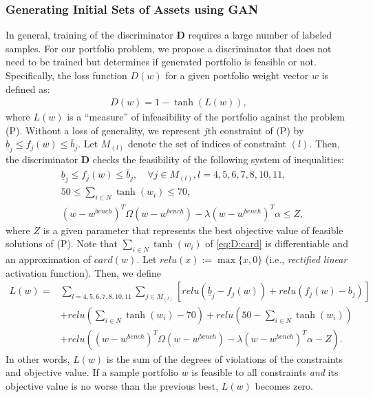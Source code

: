 \documentclass[11pt]{article}
\begin{document}
	\subsubsection{Generating Initial Sets of Assets using GAN}
	
	In general, training of the discriminator \textbf{D} requires a large number of labeled samples. For our portfolio problem, we propose a discriminator that does not need to be trained but determines if generated portfolio is feasible or not. 
	Specifically, the loss function $D(w)$ for a given portfolio weight vector $w$ is defined as:
	\begin{align}
	D(w) = 1 - \tanh(L(w)),
	\end{align}
	where $L(w)$ is a ``measure'' of infeasibility of the portfolio against the problem (P). Without a loss of generality, we represent $j$th constraint of (P) by $\underline{b}_j \le f_j (w) \le \overline{b}_j$. Let $M_{(l)}$ denote the set of indices of constraint $(l)$. Then, the discriminator \textbf{D} checks the feasibility of the following system of inequalities:
	\begin{align}
	& \underline{b}_j \le f_j (w) \le \overline{b}_j, \quad \forall j \in M_{(l)}, l = 4,5,6,7,8,10,11,\\
	& 50 \le \sum_{i \in N} \tanh (w_i) \le 70, \label{eq:D:card} \\
	& (w-w^{bench})^T \Omega (w-w^{bench}) - \lambda (w-w^{bench})^T \alpha \le Z, \label{eq:D:obj}
	\end{align}
	where $Z$ is a given parameter that represents the best objective value of feasible solutions of (P). Note that $\sum_{i \in N} \tanh (w_i)$ of \eqref{eq:D:card} is differentiable and an approximation of $card(w)$. Let $relu(x) := \max \{x,0\}$ (i.e., \emph{rectified linear} activation function). Then, we define
	\begin{align*}
	L(w) =& \sum_{l =4,5,6,7,8,10,11} \sum_{j \in M_{(l)}} \left[ relu( \underline{b}_j - f_j (w) ) + relu( f_j (w) - \overline{b}_j ) \right]\\
	&+ relu\left(\sum_{i \in N} \tanh (w_i) - 70 \right) + relu\left(50 - \sum_{i \in N} \tanh (w_i) \right)\\
	&+ relu\left((w-w^{bench})^T \Omega (w-w^{bench}) - \lambda (w-w^{bench})^T \alpha - Z \right).
	\end{align*}
	In other words, $L(w)$ is the sum of the degrees of violations of the constraints and objective value. If a sample portfolio $w$ is feasible to all constraints \emph{and} its objective value is no worse than the previous best, $L(w)$ becomes zero. 
	
\end{document}
